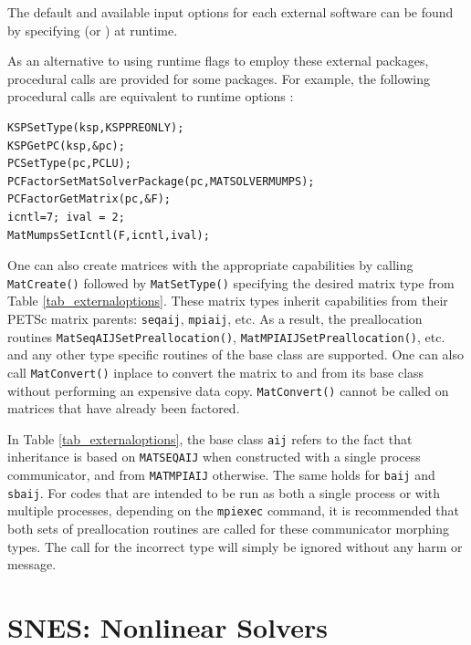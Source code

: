 The default and available input options for each external software can be found
by specifying  (or ) at runtime.

As an alternative to using runtime flags to employ these external
packages,
procedural calls are provided for some packages. For example, the following procedural calls
are equivalent to runtime options
   :
\begin{lstlisting}
KSPSetType(ksp,KSPPREONLY);
KSPGetPC(ksp,&pc);
PCSetType(pc,PCLU);
PCFactorSetMatSolverPackage(pc,MATSOLVERMUMPS);
PCFactorGetMatrix(pc,&F);
icntl=7; ival = 2;
MatMumpsSetIcntl(F,icntl,ival);
\end{lstlisting}

One can also create matrices with the appropriate
capabilities by calling \lstinline{MatCreate()} followed by \lstinline{MatSetType()}
specifying the desired matrix type from Table \ref{tab_externaloptions}.
These matrix types inherit capabilities from their PETSc matrix
parents: \lstinline{seqaij}, \lstinline{mpiaij}, etc.  As a result, the preallocation routines
\lstinline{MatSeqAIJSetPreallocation()}, \lstinline{MatMPIAIJSetPreallocation()}, etc. and any other type
specific routines of the base class are supported.  One can also
call \lstinline{MatConvert()} inplace to convert the matrix to and from its base
class without performing an expensive data copy.  \lstinline{MatConvert()} cannot be
called on matrices that have already been factored.

In Table \ref{tab_externaloptions}, the base class \lstinline{aij} refers to the fact
that inheritance is based on \lstinline{MATSEQAIJ} when constructed with a single
process communicator, and from \lstinline{MATMPIAIJ} otherwise.  The same holds
for \lstinline{baij} and \lstinline{sbaij}.  For codes that are intended to be run as both a
single process or with multiple processes, depending on the \lstinline{mpiexec}
command, it is recommended that both sets of preallocation routines
are called for these communicator morphing types.  The call for the
incorrect type will simply be ignored without any harm or message.

\cleardoublepage
\chapter{SNES: Nonlinear Solvers}
\label{chapter_snes}

